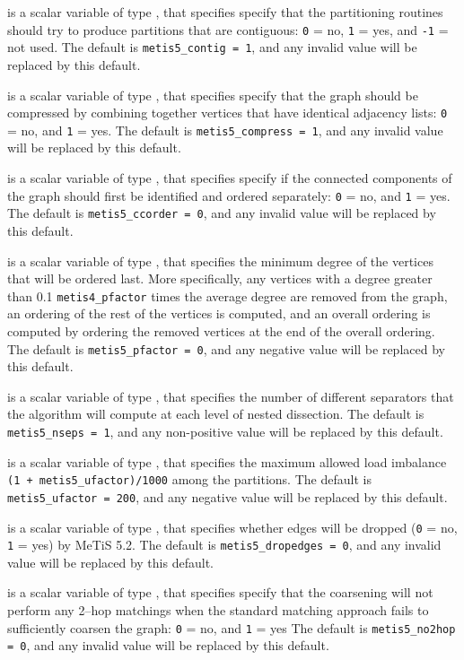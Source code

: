 \documentclass{galahad}
\begin{document}
\begin{description}
 is a scalar variable of type \integer, that specifies
specify that the partitioning routines should try to produce partitions 
that are contiguous: {\tt 0} = no, {\tt 1} = yes, and {\tt -1} = not used.
The default is {\tt metis5\_contig = 1}, and any invalid value will be
replaced by this default.

 is a scalar variable of type \integer, that specifies
specify that the graph should be compressed by combining together vertices 
that have identical adjacency lists: {\tt 0} = no, and {\tt 1} = yes.
The default is {\tt metis5\_compress = 1}, and any invalid value will be
replaced by this default.

 is a scalar variable of type \integer, that specifies
specify if the connected components of the graph should first be
identified and ordered separately: {\tt 0} = no, and {\tt 1} = yes.
The default is {\tt metis5\_ccorder = 0}, and any invalid value will be
replaced by this default.

 is a scalar variable of type \integer, that specifies
the minimum degree of the vertices that will be ordered last.
More specifically, any vertices with a degree greater than 
0.1 {\tt metis4\_pfactor} times the average degree are removed from
the graph, an ordering of the rest of the vertices is computed, and an
overall ordering is computed by ordering the removed vertices at the end
of the overall ordering. The default is {\tt metis5\_pfactor = 0}, and any 
negative value will be replaced by this default.

 is a scalar variable of type \integer, that specifies
the number of different separators that the algorithm will compute
at each level of nested dissection.
The default is {\tt metis5\_nseps = 1}, and any non-positive value will be
replaced by this default.

 is a scalar variable of type \integer, that specifies
the maximum allowed load imbalance {\tt (1 +  metis5\_ufactor)/1000} 
among the partitions.
The default is {\tt metis5\_ufactor = 200}, and any negative value will be
replaced by this default.

 is a scalar variable of type \integer, that specifies
whether edges will be dropped ({\tt 0} = no, {\tt 1} = yes) by MeTiS 5.2.
The default is {\tt metis5\_dropedges = 0}, and any invalid value will be
replaced by this default.

 is a scalar variable of type \integer, that specifies
specify that the coarsening will not perform any 2–hop matchings when 
the standard matching approach fails to sufficiently coarsen the graph:
{\tt 0} = no, and {\tt 1} = yes
The default is {\tt metis5\_no2hop = 0}, and any invalid value will be
replaced by this default.


\end{description}
\end{document}
